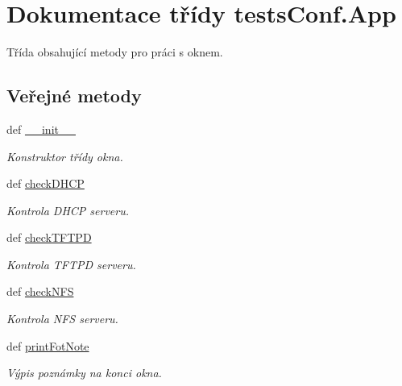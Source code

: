 \hypertarget{classtestsConf_1_1App}{\section{Dokumentace třídy tests\-Conf.\-App}
\label{d0/dec/classtestsConf_1_1App}
}


Třída obsahující metody pro práci s oknem.  


\subsection*{Veřejné metody}
\begin{DoxyCompactItemize}
\item 
def \hyperlink{classtestsConf_1_1App_aafb00450b85161e0b88c453190f4ebe1}{\-\_\-\-\_\-init\-\_\-\-\_\-}
\begin{DoxyCompactList}\small\item\em Konstruktor třídy okna. \end{DoxyCompactList}\item 
def \hyperlink{classtestsConf_1_1App_adc3d1efd34ec3da2a02d0636f42a0a36}{check\-D\-H\-C\-P}
\begin{DoxyCompactList}\small\item\em Kontrola D\-H\-C\-P serveru. \end{DoxyCompactList}\item 
def \hyperlink{classtestsConf_1_1App_aecb4ac6430df058ba8ed129e177e9456}{check\-T\-F\-T\-P\-D}
\begin{DoxyCompactList}\small\item\em Kontrola T\-F\-T\-P\-D serveru. \end{DoxyCompactList}\item 
def \hyperlink{classtestsConf_1_1App_ae458e93eb07be41d3b22b69e4b76458a}{check\-N\-F\-S}
\begin{DoxyCompactList}\small\item\em Kontrola N\-F\-S serveru. \end{DoxyCompactList}\item 
def \hyperlink{classtestsConf_1_1App_a2e3c79bd3ed87d03aa5dced0f0e5e02c}{print\-Fot\-Note}
\begin{DoxyCompactList}\small\item\em Výpis poznámky na konci okna. \end{DoxyCompactList}\end{DoxyCompactItemize}

